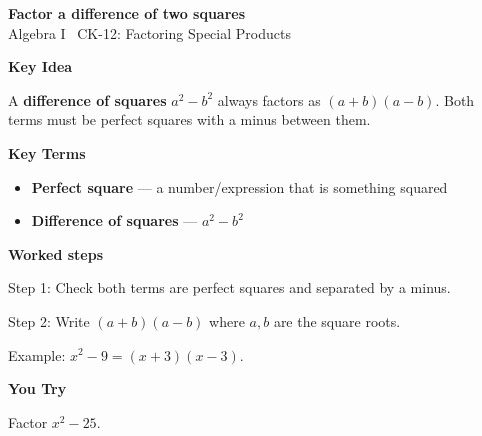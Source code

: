 \documentclass[12pt]{article}
\begin{document}
\begin{center}{\Large \textbf{Factor a difference of two squares}}\\[2pt]{\small Algebra I \textbar\ CK-12: Factoring Special Products}\end{center}\vspace{0.25cm}

{\large\textbf{Key Idea}}\par\smallskip
A \textbf{difference of squares} $a^2-b^2$ always factors as $(a+b)(a-b)$. Both terms must be perfect squares with a minus between them.\par


{\large\textbf{Key Terms}}\par\smallskip
\begin{itemize}[leftmargin=1.4em]
  \item \textbf{Perfect square} — a number/expression that is something squared
  \item \textbf{Difference of squares} — $a^2-b^2$
\end{itemize}


{\large\textbf{Worked steps}}\par\smallskip
Step 1: Check both terms are perfect squares and separated by a minus.\par
Step 2: Write $(a+b)(a-b)$ where $a,b$ are the square roots.\par
Example: $x^2-9=(x+3)(x-3)$.\par


{\large\textbf{You Try}}\par\smallskip
Factor $x^2-25$.\par
\end{document}

